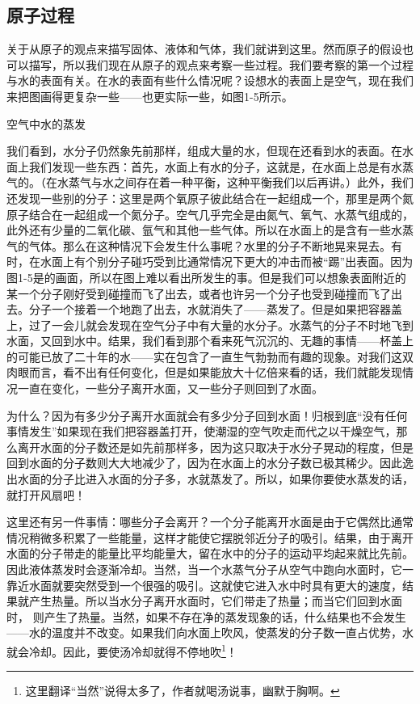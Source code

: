 \documentclass[11pt,oneside]{book}
\begin{document}
\begin{common-format}
\section{原子过程}
关于从原子的观点来描写固体、液体和气体，我们就讲到这里。然而原子的假设也可以描写，所以我们现在从原子的观点来考察一些过程。我们要考察的第一个过程与水的表面有关。在水的表面有些什么情况呢？设想水的表面上是空气，现在我们来把图画得更复杂一些——也更实际一些，如图1-5所示。
\begin{fig}{空气中水的蒸发}
\label{fig:空气中水的蒸发}
\end{fig}
我们看到，水分子仍然象先前那样，组成大量的水，但现在还看到水的表面。在水面上我们发现一些东西：首先，水面上有水的分子，这就是，在水面上总是有水蒸气的。（在水蒸气与水之间存在着一种平衡，这种平衡我们以后再讲。）此外，我们还发现一些别的分子：这里是两个氧原子彼此结合在一起组成一个，那里是两个氮原子结合在一起组成一个氮分子。空气几乎完全是由氮气、氧气、水蒸气组成的，此外还有少量的二氧化碳、氩气和其他一些气体。所以在水面上的是含有一些水蒸气的气体。那么在这种情况下会发生什么事呢？水里的分子不断地晃来晃去。有时，在水面上有个别分子碰巧受到比通常情况下更大的冲击而被“踢”出表面。因为图1-5是的画面，所以在图上难以看出所发生的事。但是我们可以想象表面附近的某一个分子刚好受到碰撞而飞了出去，或者也许另一个分子也受到碰撞而飞了出去。分子一个接着一个地跑了出去，水就消失了——蒸发了。但是如果把容器盖上，过了一会儿就会发现在空气分子中有大量的水分子。水蒸气的分子不时地飞到水面，又回到水中。结果，我们看到那个看来死气沉沉的、无趣的事情——杯盖上的可能已放了二十年的水——实在包含了一直生气勃勃而有趣的现象。对我们这双肉眼而言，看不出有任何变化，但是如果能放大十亿倍来看的话，我们就能发现情况一直在变化，一些分子离开水面，又一些分子则回到了水面。

为什么？因为有多少分子离开水面就会有多少分子回到水面！归根到底“没有任何事情发生”如果现在我们把容器盖打开，使潮湿的空气吹走而代之以干燥空气，那么离开水面的分子数还是如先前那样多，因为这只取决于水分子晃动的程度，但是回到水面的分子数则大大地减少了，因为在水面上的水分子数已极其稀少。因此逸出水面的分子比进入水面的分子多，水就蒸发了。所以，如果你要使水蒸发的话，就打开风扇吧！

这里还有另一件事情：哪些分子会离开？一个分子能离开水面是由于它偶然比通常情况稍微多积累了一些能量，这样才能使它摆脱邻近分子的吸引。结果，由于离开水面的分子带走的能量比平均能量大，留在水中的分子的运动平均起来就比先前。因此液体蒸发时会逐渐冷却。当然，当一个水蒸气分子从空气中跑向水面时，它一靠近水面就要突然受到一个很强的吸引。这就使它进入水中时具有更大的速度，结果就产生热量。所以当水分子离开水面时，它们带走了热量；而当它们回到水面时， 则产生了热量。当然，如果不存在净的蒸发现象的话，什么结果也不会发生——水的温度并不改变。如果我们向水面上吹风，使蒸发的分子数一直占优势，水就会冷却。因此，要使汤冷却就得不停地吹\footnote{这里翻译“当然”说得太多了，作者就喝汤说事，幽默于胸啊。}！


\end{common-format}
\end{document}
